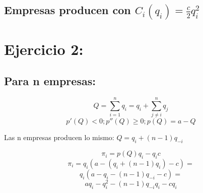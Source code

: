 \documentclass{article}
\theoremstyle{definition}
\theoremstyle{remark}
\begin{document}
\subsection{Empresas producen con $C_i(q_i)=\frac{c}{2}q_i^2$}                                                                                                                                                                                                                                                                                                                                                                                                                                                                                                                                                                                                                                                                                                                                                                                                                                                                                                                                                                                                                                                                                                                                                                                                                                                                                                                                                                    

\section{Ejercicio 2:}                     
\subsection{Para n empresas:}

$$Q=\sum_{i=1}^nq_i=q_i+\sum_{j\neq i}^nq_j$$             
$$p'(Q)<0; p''(Q)\geq0; p(Q)=a-Q$$                                
         
Las n empresas producen lo mismo: $Q=q_i+(n-1)q_{-i}$
                                                                                                                                                                                                           
$$\pi_i=p(Q)q_i-q_ic$$
$$\pi_i=q_i(a-(q_i+(n-1)q_i)-c)=$$
$$q_i(a-q_i-(n-1)q_{-i}-c)=$$
$$aq_i-q_i^2-(n-1)q_{-i}q_i-cq_i$$
\end{document}
